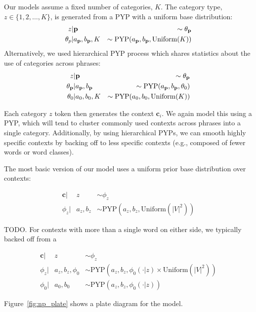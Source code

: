 Our models assume a fixed number of categories, $K$. The category type, $z \in \{ 1 , 2 , \ldots , K \}$, is generated from a PYP with a uniform base distribution:
\begin{align*}
z &| \textbf{p} & \sim \theta_{\textbf{p}} \\
\theta_p &| a_{\textbf{p}},b_{\textbf{p}},K & \sim \textrm{PYP}(a_{\textbf{p}},b_{\textbf{p}},\textrm{Uniform}(K))
\end{align*}
\noindent Alternatively, we used hierarchical PYP process which shares statistics about the use of categories across phrases:
\begin{align*}
z &| \textbf{p} & \sim \theta_{\textbf{p}} \\
\theta_{\textbf{p}} &| a_{\textbf{p}},b_{\textbf{p}} & \sim \textrm{PYP}(a_{\textbf{p}},b_{\textbf{p}},\theta_0) \\
\theta_0 &| a_0,b_0,K & \sim \textrm{PYP}(a_0,b_0,\textrm{Uniform}(K))
\end{align*}

\noindent Each category $z$ token then generates the context $\textbf{c}_i$. We again model this using a PYP, which will tend to cluster commonly used contexts across phrases into a single category. Additionally, by using hierarchical PYPs, we can smooth highly specific contexts by backing off to less specific contexts (e.g., composed of fewer words or word classes).

The most basic version of our model uses a uniform prior base distribution over contexts:

\begin{align*}
\textbf{c} |& z & \sim \phi_z \\
\phi_z |& a_z,b_z & \sim \textrm{PYP}(a_z,b_z,\textrm{Uniform}(|V|^2))
\end{align*}

\noindent TODO. For contexts with more than a single word on either side, we typically backed off from a 

\begin{align*}
\textbf{c} |& z & \sim \phi_z \\
\phi_z |& a_z,b_z, \phi_0 & \sim \textrm{PYP}(a_z,b_z,\phi_0(\cdot|z) \times \textrm{Uniform}(|V|^2)) \\
\phi_0 |& a_0,b_0 & \sim \textrm{PYP}(a_z,b_z,\phi_0(\cdot|z))
\end{align*}

\noindent Figure~\ref{fig:np_plate} shows a plate diagram for the model.

